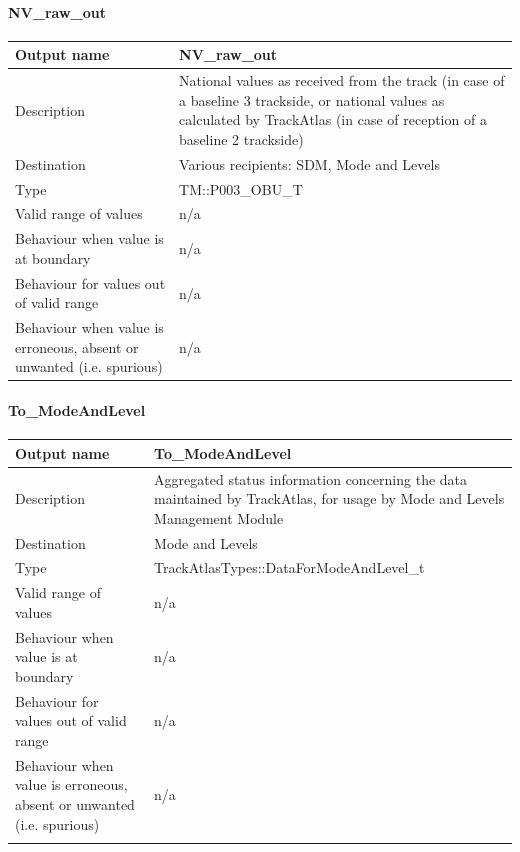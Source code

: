 \paragraph{NV\_raw\_out}

\begin{longtable}{p{}p{}}
\toprule
Output name				& NV\_raw\_out \\
\midrule
Description				& National values as received from the track (in case of a baseline 3 trackside, or national values as calculated by TrackAtlas (in case of reception of a baseline 2 trackside) \\
\midrule
Destination				& Various recipients: SDM, Mode and Levels\\ 
\midrule
Type					& TM::P003\_OBU\_T \\
\midrule
Valid range of values	& n/a \\
\midrule
Behaviour when value is at boundary	& n/a  \\
\midrule
Behaviour for values out of valid range	& n/a  \\
\midrule
Behaviour when value is erroneous, absent or unwanted (i.e. spurious) & n/a  \\
\bottomrule
\end{longtable}


\paragraph{To\_ModeAndLevel}

\begin{longtable}{p{}p{}}
\toprule
Output name				& To\_ModeAndLevel \\
\midrule
Description				& Aggregated status information concerning the data maintained by TrackAtlas, for usage by Mode and Levels Management Module \\
\midrule
Destination				& Mode and Levels \\ 
\midrule
Type					& TrackAtlasTypes::DataForModeAndLevel\_t\\
\midrule
Valid range of values	& n/a \\
\midrule
Behaviour when value is at boundary	& n/a  \\
\midrule
Behaviour for values out of valid range	& n/a  \\
\midrule
Behaviour when value is erroneous, absent or unwanted (i.e. spurious) & n/a  \\
\\
\bottomrule
\end{longtable}

